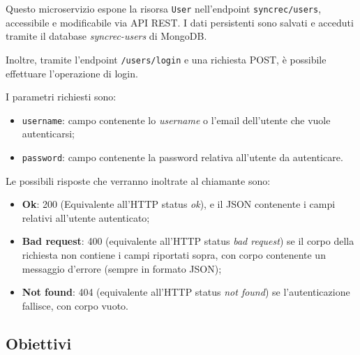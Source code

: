 Questo microservizio espone la risorsa \texttt{User} nell'endpoint
\texttt{syncrec/users}, accessibile e modificabile via API REST. I dati persistenti sono salvati e acceduti tramite il database \textit{syncrec-users} di
MongoDB.

Inoltre, tramite l'endpoint \texttt{/users/login} e una richiesta POST,
è possibile effettuare l'operazione di login.

I parametri richiesti sono:
\begin{itemize}
	\item \texttt{username}: campo contenente lo \textit{username} o l'email dell'utente che vuole autenticarsi;
	\item \texttt{password}: campo contenente la password relativa all'utente da autenticare.
\end{itemize}

Le possibili risposte che verranno inoltrate al chiamante sono:
\begin{itemize}
	\item \textbf{Ok}: 200 (Equivalente all'HTTP status \textit{ok}), e il JSON contenente i campi relativi all'utente autenticato;
	\item \textbf{Bad request}: 400 (equivalente all'HTTP status \textit{bad request}) se il corpo della richiesta non contiene i campi riportati sopra, con corpo contenente un messaggio d'errore (sempre in formato JSON);
	\item \textbf{Not found}: 404 (equivalente all'HTTP status \textit{not found}) se l'autenticazione fallisce, con corpo vuoto.
\end{itemize}



\subsection{Obiettivi}

